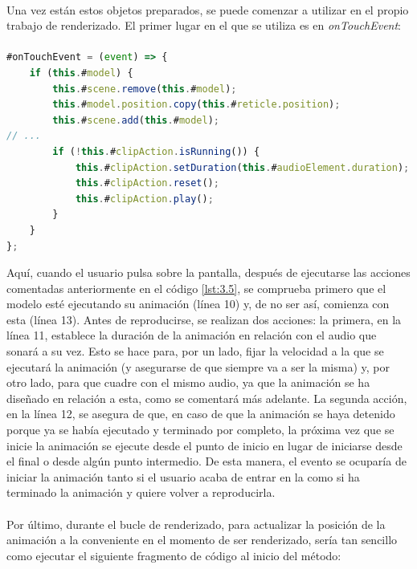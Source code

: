 \documentclass{subfiles}
\begin{document}
        \paragraph{}
        Una vez están estos objetos preparados, se puede comenzar a utilizar en el propio trabajo de renderizado. El primer lugar en el que se utiliza es en \textit{onTouchEvent}:

\paragraph{}
\begin{lstlisting}[language=JavaScript, caption={Evento onTouchEvent junto con las acciones relacionadas con la animación.}, label={lst:3.8}]
#onTouchEvent = (event) => {
    if (this.#model) {
        this.#scene.remove(this.#model);
        this.#model.position.copy(this.#reticle.position);
        this.#scene.add(this.#model);
// ...
        if (!this.#clipAction.isRunning()) {
            this.#clipAction.setDuration(this.#audioElement.duration);
            this.#clipAction.reset();
            this.#clipAction.play();
        }
    }
};
\end{lstlisting}

        Aquí, cuando el usuario pulsa sobre la pantalla, después de ejecutarse las acciones comentadas anteriormente en el código \ref{lst:3.5}, se comprueba primero que el modelo esté ejecutando su animación (línea 10) y, de no ser así, comienza con esta (línea 13). Antes de reproducirse, se realizan dos acciones: la primera, en la línea 11, establece la duración de la animación en relación con el audio que sonará a su vez. Esto se hace para, por un lado, fijar la velocidad a la que se ejecutará la animación (y asegurarse de que siempre va a ser la misma) y, por otro lado, para que cuadre con el mismo audio, ya que la animación se ha diseñado en relación a esta, como se comentará más adelante. La segunda acción, en la línea 12, se asegura de que, en caso de que la animación se haya detenido porque ya se había ejecutado y terminado por completo, la próxima vez que se inicie la animación se ejecute desde el punto de inicio en lugar de iniciarse desde el final o desde algún punto intermedio. De esta manera, el evento se ocuparía de iniciar la animación tanto si el usuario acaba de entrar en la \ra como si ha terminado la animación y quiere volver a reproducirla.
        
        \paragraph{}
        Por último, durante el bucle de renderizado, para actualizar la posición de la animación a la conveniente en el momento de ser renderizado, sería tan sencillo como ejecutar el siguiente fragmento de código al inicio del método:
\end{document}
